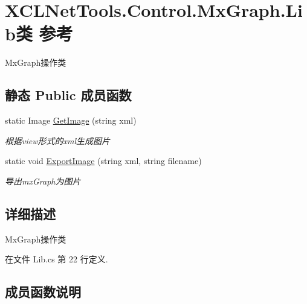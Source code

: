 \hypertarget{class_x_c_l_net_tools_1_1_control_1_1_mx_graph_1_1_lib}{}\section{X\+C\+L\+Net\+Tools.\+Control.\+Mx\+Graph.\+Lib类 参考}
\label{class_x_c_l_net_tools_1_1_control_1_1_mx_graph_1_1_lib}


Mx\+Graph操作类  


\subsection*{静态 Public 成员函数}
\begin{DoxyCompactItemize}
\item 
static Image \hyperlink{class_x_c_l_net_tools_1_1_control_1_1_mx_graph_1_1_lib_abff455d51f61485d6bf26e0133af6000}{Get\+Image} (string xml)
\begin{DoxyCompactList}\small\item\em 根据view形式的xml生成图片 \end{DoxyCompactList}\item 
static void \hyperlink{class_x_c_l_net_tools_1_1_control_1_1_mx_graph_1_1_lib_ad6b09c60b11a1f51a6bf45cc3bde1b88}{Export\+Image} (string xml, string filename)
\begin{DoxyCompactList}\small\item\em 导出mx\+Graph为图片 \end{DoxyCompactList}\end{DoxyCompactItemize}


\subsection{详细描述}
Mx\+Graph操作类 



在文件 Lib.\+cs 第 22 行定义.



\subsection{成员函数说明}
\mbox{\label{class_x_c_l_net_tools_1_1_control_1_1_mx_graph_1_1_lib_ad6b09c60b11a1f51a6bf45cc3bde1b88}} 
